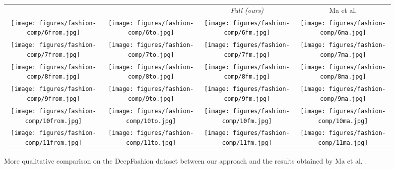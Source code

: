 \documentclass[10pt,twocolumn,letterpaper]{article}
\begin{document}
\begin{figure*}[h]
  \centering
  \setlength\tabcolsep{1.0pt}
\begin{tabular}{cccc}
 &   & \small\emph{Full (ours)}& Ma et al. \cite{ma2017pose}\\ 
\texttt{[image: figures/fashion-comp/6from.jpg]}
&\texttt{[image: figures/fashion-comp/6to.jpg]}
&\texttt{[image: figures/fashion-comp/6fm.jpg]}
&\texttt{[image: figures/fashion-comp/6ma.jpg]}
\\
\texttt{[image: figures/fashion-comp/7from.jpg]}
&\texttt{[image: figures/fashion-comp/7to.jpg]}
&\texttt{[image: figures/fashion-comp/7fm.jpg]}
&\texttt{[image: figures/fashion-comp/7ma.jpg]}
\\
\texttt{[image: figures/fashion-comp/8from.jpg]}
&\texttt{[image: figures/fashion-comp/8to.jpg]}
&\texttt{[image: figures/fashion-comp/8fm.jpg]}
&\texttt{[image: figures/fashion-comp/8ma.jpg]}
\\
\texttt{[image: figures/fashion-comp/9from.jpg]}
&\texttt{[image: figures/fashion-comp/9to.jpg]}
&\texttt{[image: figures/fashion-comp/9fm.jpg]}
&\texttt{[image: figures/fashion-comp/9ma.jpg]}
\\
\texttt{[image: figures/fashion-comp/10from.jpg]}
&\texttt{[image: figures/fashion-comp/10to.jpg]}
&\texttt{[image: figures/fashion-comp/10fm.jpg]}
&\texttt{[image: figures/fashion-comp/10ma.jpg]}
\\
\texttt{[image: figures/fashion-comp/11from.jpg]}
&\texttt{[image: figures/fashion-comp/11to.jpg]}
&\texttt{[image: figures/fashion-comp/11fm.jpg]}
&\texttt{[image: figures/fashion-comp/11ma.jpg]}
\end{tabular}
  \caption{More qualitative comparison on the DeepFashion dataset between our approach and the results obtained by Ma et al. \cite{ma2017pose}.}
\label{fig:comparison-Fashion-2}
\end{figure*}
\end{document}
